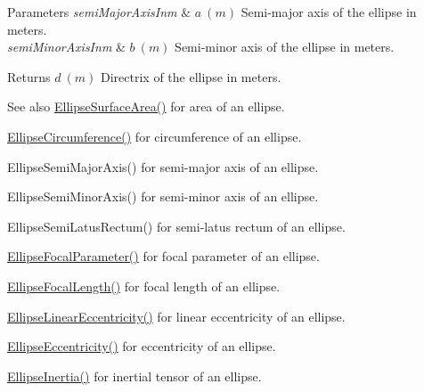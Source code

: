 \begin{DoxyParams}{Parameters}
{\em semi\+Major\+Axis\+Inm} & $ a\ (m)$ Semi-\/major axis of the ellipse in meters. \\
\hline
{\em semi\+Minor\+Axis\+Inm} & $ b\ (m)$ Semi-\/minor axis of the ellipse in meters. \\
\hline
\end{DoxyParams}
\begin{DoxyReturn}{Returns}
$ d\ (m)$ Directrix of the ellipse in meters. 
\end{DoxyReturn}
\begin{DoxySeeAlso}{See also}
\mbox{\hyperlink{group___e_g_x_math-_geometry-2_d-_ellipse-_surface_area_ga4ce8c8323e9718ce5458f4ab7f6d823d}{Ellipse\+Surface\+Area()}} for area of an ellipse. 

\mbox{\hyperlink{group___e_g_x_math-_geometry-2_d-_ellipse-_circumference_ga4172802ac674eb53467b44928ac635c7}{Ellipse\+Circumference()}} for circumference of an ellipse. 

Ellipse\+Semi\+Major\+Axis() for semi-\/major axis of an ellipse. 

Ellipse\+Semi\+Minor\+Axis() for semi-\/minor axis of an ellipse. 

Ellipse\+Semi\+Latus\+Rectum() for semi-\/latus rectum of an ellipse. 

\mbox{\hyperlink{group___e_g_x_math-_geometry-2_d-_ellipse-_focal_parameter_ga4cd01a38c72c092ef9791351948bf69b}{Ellipse\+Focal\+Parameter()}} for focal parameter of an ellipse. 

\mbox{\hyperlink{group___e_g_x_math-_geometry-2_d-_ellipse-_focal_length_gab8d63de7640c880cfecaeada6f2afdac}{Ellipse\+Focal\+Length()}} for focal length of an ellipse. 

\mbox{\hyperlink{group___e_g_x_math-_geometry-2_d-_ellipse-_linear_eccentricity_gac70b3010e30aa8b73deb50fe2b9b9a91}{Ellipse\+Linear\+Eccentricity()}} for linear eccentricity of an ellipse. 

\mbox{\hyperlink{group___e_g_x_math-_geometry-2_d-_ellipse-_eccentricity_ga6a0a7fba17f782616894cfc447628c33}{Ellipse\+Eccentricity()}} for eccentricity of an ellipse. 

\mbox{\hyperlink{group___e_g_x_math-_geometry-2_d-_ellipse-_inertia_ga10a3049c2f04b50f271fb01dc62e4cf8}{Ellipse\+Inertia()}} for inertial tensor of an ellipse. 
\end{DoxySeeAlso}
